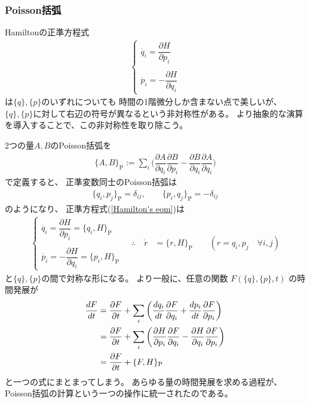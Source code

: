\subsubsection{Poisson括弧}

Hamiltonの正準方程式
\begin{align}
   \begin{cases}
      \dot{q_i} = \dfrac{\partial H}{\partial p_i}
    \\
    \\
      \dot{p_i} = - \dfrac{\partial H}{\partial q_i}
    \end{cases}
\label{Hamilton's eom}
\end{align}
は$\{q\},\{p\}$のいずれについても
時間の1階微分しか含まない点で美しいが、
$\{q\},\{p\}$に対して右辺の符号が異なるという非対称性がある。
より抽象的な演算を導入することで、この非対称性を取り除こう。

2つの量$A,B$のPoisson括弧を
\begin{align}
    \{A, B\}_{ \mathrm{P} }
    := \sum_i \bigg(
        \dfrac{ \partial A }{ \partial q_i }
        \dfrac{ \partial B }{ \partial p_i }
    -
        \dfrac{ \partial B }{ \partial q_i }
        \dfrac{ \partial A }{ \partial q_i }
    \bigg)
\end{align}
で定義すると、
正準変数同士のPoisson括弧は
\begin{align}
   \{q_i, p_j\}_{ \mathrm{P} }
   = \delta_{ij}
,\qquad
   \{p_i, q_j\}_{ \mathrm{P} }
   = - \delta_{ij}
\end{align}
のようになり、
正準方程式(\ref{Hamilton's eom})は
\begin{align}
    \begin{cases}
        \dot{q_i}
        = \dfrac{\partial H}{\partial p_i}
        = \{q_i, H\}_{ \mathrm{P} }
      \\
      \\
        \dot{p_i}
        = - \dfrac{\partial H}{\partial q_i}
        = \{p_i, H\}_{ \mathrm{P} }
      \end{cases}
\quad
\therefore
\quad
    \dot{r} &= \{r, H\}_{ \mathrm{P} }
\qquad
    ( r = q_i, p_j \quad\forall i, j )
\label{Hamilton e.o.m. in Poisson bracket}
\end{align}
と$\{q\},\{p\}$の間で対称な形になる。
より一般に、任意の関数
$F( \{q\},\{p\} , t )$
の時間発展が
\begin{align}
  \dfrac{ d F }{ dt }
  &=
  \dfrac{ \partial F }{ \partial t }
  +
  \sum_i
  \bigg(
    \dfrac{ d q_i }{ dt }
    \dfrac{ \partial F }{ \partial q_i }
  +
    \dfrac{ d p_i }{ dt }
    \dfrac{ \partial F }{ \partial p_i }
  \bigg)
\notag\\&=
  \dfrac{ \partial F }{ \partial t }
  +
  \sum_i
  \bigg(
    \dfrac{\partial H}{\partial p_i}
    \dfrac{ \partial F }{ \partial q_i }
  -
    \dfrac{\partial H}{\partial q_i}
    \dfrac{ \partial F }{ \partial p_i }
  \bigg)
\notag\\&=
  \dfrac{ \partial F }{ \partial t } + \{F, H\}_{ \mathrm{P} }
\label{time evolution in Poisson bracket}
\end{align}
と一つの式にまとまってしまう。
あらゆる量の時間発展を求める過程が、
Poisson括弧の計算という一つの操作に統一されたのである。
